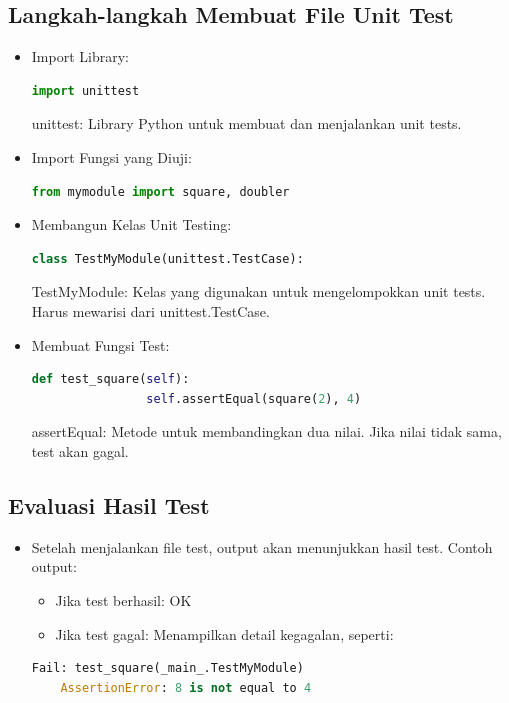 \documentclass{article}
\begin{document}
\subsection{Langkah-langkah Membuat File Unit Test}
\begin{itemize}
    \item Import Library:
          \begin{lstlisting}[language=Python, caption={}, captionpos=b]
            import unittest
        \end{lstlisting}
          unittest: Library Python untuk membuat dan menjalankan unit tests.
    \item Import Fungsi yang Diuji:
          \begin{lstlisting}[language=Python, caption={}, captionpos=b]
            from mymodule import square, doubler
        \end{lstlisting}
    \item Membangun Kelas Unit Testing:
          \begin{lstlisting}[language=Python, caption={}, captionpos=b]
            class TestMyModule(unittest.TestCase):
        \end{lstlisting}
          TestMyModule: Kelas yang digunakan untuk mengelompokkan unit tests. Harus mewarisi dari unittest.TestCase.
    \item Membuat Fungsi Test:
          \begin{lstlisting}[language=Python, caption={}, captionpos=b]
            def test_square(self):
                self.assertEqual(square(2), 4)
\end{lstlisting}
          assertEqual: Metode untuk membandingkan dua nilai. Jika nilai tidak sama, test akan gagal.
\end{itemize}

\subsection{Evaluasi Hasil Test}
\begin{itemize}
    \item Setelah menjalankan file test, output akan menunjukkan hasil test. Contoh output:
          \begin{itemize}
              \item Jika test berhasil: OK
              \item Jika test gagal: Menampilkan detail kegagalan, seperti:
          \end{itemize}
          \begin{lstlisting}[language=Python, caption={}, captionpos=b]
    Fail: test_square(_main_.TestMyModule)
    AssertionError: 8 is not equal to 4
\end{lstlisting}
\end{itemize}
\end{document}
